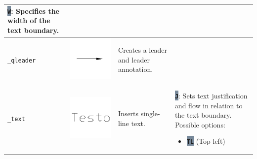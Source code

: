\documentclass[..]{../IEEEphot}
\newcommand{\param}[1]{\colorbox{LightSlateGray}{\color{Navy}\texttt{\textbf{#1}}}}
\begin{document}
\begin{center}
\begin{longtable}{m{.2\linewidth}m{.2\linewidth}m{.25\linewidth}m{.25\linewidth}}
\param{W}: Specifies the width of the text boundary.
\\
\midrule
\texttt{\_qleader} & \includegraphics[width = 0.8\linewidth, keepaspectratio]{../images/jpg/_qleader.jpg} & Creates a leader and leader annotation. \\
\midrule
\texttt{\_text} & \includegraphics[width = 0.8\linewidth, keepaspectratio]{../images/jpg/_text.jpg} & Inserts single-line text. & 
\param{J}: Sets text justification and flow in relation to the text boundary. Possible options:
\begin{itemize}
\item \param{TL} (Top left)

\end{itemize}
\end{longtable}
\end{center}
\end{document}
